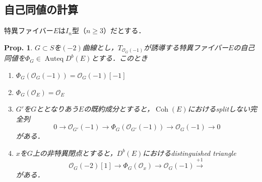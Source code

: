 \documentclass[uplatex,a4paper,11pt,dvipdfmx]{jsarticle}
\theoremstyle{mystyle} %
\newtheorem{proposition}[theorem]{Prop.}
\DeclareMathOperator{\Auteq}{Auteq}\DeclareMathOperator{\Coh}{Coh}
\DeclareMathOperator{\Ext}{Ext}
\begin{document}
\subsection{自己同値の計算}
特異ファイバー$E$は$I_n$型（$n\geq 3$）だとする．
\begin{proposition}
	$G \subset S$を$(-2)$曲線とし，$T_{\mathcal{O}_G(-1)}$が誘導する特異ファイバー$E$の自己同値を$\Phi_G \in \Auteq D^b(E)$とする．このとき
	\begin{enumerate}
		\item $\Phi_G(\mathcal{O}_G(-1)) = \mathcal{O}_G(-1)[-1]$
		\item $\Phi_G(\mathcal{O}_E) = \mathcal{O}_E$
		\item $G'$を$G$ととなりあう$E$の既約成分とすると，$\Coh(E)$におけるsplitしない完全列$$0 \to \mathcal{O}_{G'}(-1) \to \Phi_G(\mathcal{O}_{G'}(-1)) \to \mathcal{O}_G(-1) \to 0$$がある．
		\item $x$を$G$上の非特異閉点とすると，$D^b(E)$におけるdistinguished triangle$$\mathcal{O}_G(-2)[1]\to \Phi_G(\mathcal{O}_x)\to \mathcal{O}_G(-1) \xrightarrow{+1} $$がある．
	\end{enumerate}
\end{proposition}
\end{document}
